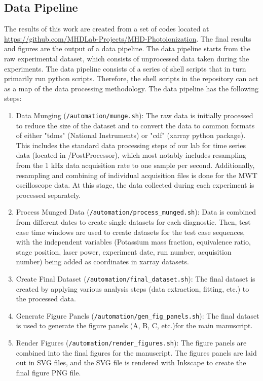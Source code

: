 \clearpage

\subsection{Data Pipeline}

The results of this work are created from a set of codes located at \url{https://github.com/MHDLab-Projects/MHD-Photoionization}. The final results and figures are the output of a data pipeline.  The data pipeline starts from the raw experimental dataset, which consists of unprocessed data taken during the experiments. The data pipeline consists of a series of shell scripts that in turn primarily run python scripts. Therefore, the shell scripts in the repository can act as a map of the data processing methodology. The data pipeline has the following steps: 

\begin{enumerate}
    \item Data Munging (\texttt{/automation/munge.sh}): The raw data is initially processed to reduce the size of the dataset and to convert the data to common formats of either "tdms" (National Instruments) or "cdf" (xarray python package). This includes the standard data processing steps of our lab for time series data (located in /PostProcessor), which most notably includes resampling from the 1 kHz data acquisition rate to one sample per second. Additionally, resampling and combining of individual acquisition files is done for the MWT oscilloscope data.  At this stage, the data collected during each experiment is processed separately.
    \item Process Munged Data (\texttt{/automation/process\_munged.sh}): Data is combined from different dates to create single datasets for each diagnostic. Then, test case time windows are used to create datasets for the test case sequences, with the independent variables (Potassium mass fraction, equivalence ratio, stage position, laser power, experiment date, run number, acquisition number) being added as coordinates in xarray datasets.
    \item Create Final Dataset (\texttt{/automation/final\_dataset.sh}): The final dataset is created by applying various analysis steps (data extraction, fitting, etc.) to the processed data. 
    \item Generate Figure Panels (\texttt{/automation/gen\_fig\_panels.sh}): The final dataset is used to generate the figure panels (A, B, C, etc.)for the main manuscript. 
    \item Render Figures (\texttt{/automation/render\_figures.sh}): The figure panels are combined into the final figures for the manuscript. The figures panels are laid out in SVG files, and the SVG file is rendered with Inkscape to create the final figure PNG file. 
\end{enumerate}

